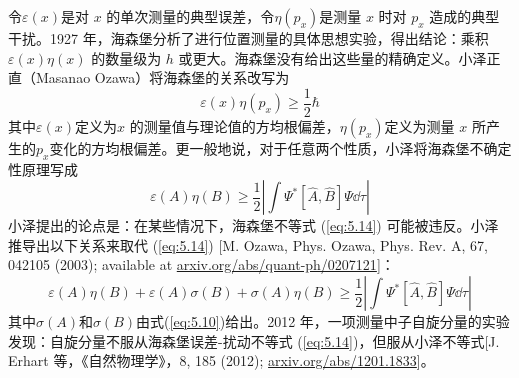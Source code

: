     令$\varepsilon\left(x\right)$是对 $x$ 的单次测量的典型误差，令$\eta \left(p_x\right)$是测量 $x$ 时对 $p_x$ 造成的典型干扰。1927 年，海森堡分析了进行位置测量的具体思想实验，得出结论：乘积 $\varepsilon\left(x\right)\eta\left(x\right)$ 的数量级为 $h$ 或更大。海森堡没有给出这些量的精确定义。小泽正直（Masanao Ozawa）将海森堡的关系改写为
    \begin{equation*}
        \varepsilon\left(x\right)\eta\left(p_x\right) \ge \frac{1}{2}\hbar
    \end{equation*}
    其中$\varepsilon\left(x\right)$定义为$x$ 的测量值与理论值的方均根偏差，$\eta\left(p_x\right)$定义为测量 $x$ 所产生的$p_x$变化的方均根偏差。更一般地说，对于任意两个性质，小泽将海森堡不确定性原理写成
    \begin{equation}
        \varepsilon\left(A\right)\eta\left(B\right) \ge \frac{1}{2}\left|\int \Psi^{\ast}\left[\hat{A},\hat{B}\right]\Psi\dd \tau\right|
        \label{eq:5.14}
    \end{equation}
    小泽提出的论点是：在某些情况下，海森堡不等式 (\ref{eq:5.14}) 可能被违反。小泽推导出以下关系来取代 (\ref{eq:5.14}) [M. Ozawa, Phys. Ozawa, Phys. Rev. A, 67, 042105 (2003); available at \url{arxiv.org/abs/quant-ph/0207121}]：
    \begin{equation*}
        \varepsilon\left(A\right)\eta\left(B\right) + \varepsilon\left(A\right)\sigma\left(B\right) + \sigma\left(A\right)\eta\left(B\right) \ge \frac{1}{2}\left|\int \Psi^{\ast}\left[\hat{A},\hat{B}\right]\Psi\dd \tau\right|
    \end{equation*}
    其中$\sigma\left(A\right)$和$\sigma\left(B\right)$由式(\ref{eq:5.10})给出。2012 年，一项测量中子自旋分量的实验发现：自旋分量不服从海森堡误差-扰动不等式 (\ref{eq:5.14})，但服从小泽不等式[J. Erhart 等，《自然物理学》，8, 185 (2012); \url{arxiv.org/abs/1201.1833}]。

